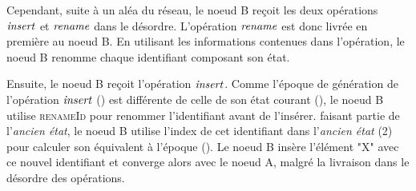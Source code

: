 Cependant, suite à un aléa du réseau, le noeud B reçoit les deux opérations $\mathit{insert}$ et $\mathit{rename}$ dans le désordre.
L'opération $\mathit{rename}$ est donc livrée en première au noeud B.
En utilisant les informations contenues dans l'opération, le noeud B renomme chaque identifiant composant son état.

Ensuite, le noeud B reçoit l'opération $\mathit{insert}$.
Comme l'époque de génération de l'opération $\mathit{insert}$ () est différente de celle de son état courant (), le noeud B utilise \textsc{renameId} pour renommer l'identifiant avant de l'insérer.
 faisant partie de l'\emph{ancien état}, le noeud B utilise l'index de cet identifiant dans l'\emph{ancien état} (2) pour calculer son équivalent à l'époque  ().
Le noeud B insère l'élément "X" avec ce nouvel identifiant et converge alors avec le noeud A, malgré la livraison dans le désordre des opérations.
